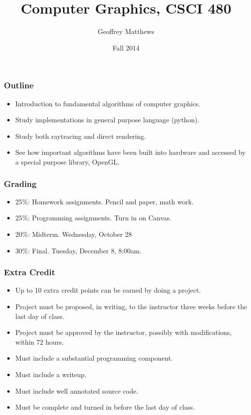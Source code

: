 \documentclass[slidestop,xcolor=pst]{beamer}
\title[Computer Graphics, CSCI 480]
{Computer Graphics, CSCI 480
}
\subtitle{} %
\author[Geoffrey Matthews]
{Geoffrey Matthews}
\institute[WWU/CS]
{
  Department of Computer Science\\
  Western Washington University
}
\date{Fall 2014}
\newcommand{\sect}[1]{\begin{frame}\frametitle{#1}}
\begin{document}
\begin{frame}
  \titlepage
\end{frame}


\sect{Outline}
\begin{itemize}
\item Introduction to fundamental algorithms of computer graphics.
\item Study implementations in general purpose language (python).
\item Study both raytracing and direct rendering.
\item See how important algorithms have been built into hardware and
  accessed by a special purpose library, OpenGL.
\end{itemize}

\end{frame}

\sect{Grading}
\begin{itemize}
\item 25\%: Homework assignments.  Pencil and paper, math work.  
\item 25\%: Programming assignments.  Turn in on Canvas.
\item 20\%: Midterm.  Wednesday, October 28
\item 30\%: Final.  Tuesday, December 8, 8:00am.
\end{itemize}
\end{frame}

\sect{Extra Credit}
\begin{itemize}
\item Up to 10 extra credit points can be earned by doing a project.
\item Project must be proposed, in writing, to the instructor three
  weeks before the last day of class.
\item Project must be approved by the instructor, possibly with
  modifications, within 72 hours.
\item Must include a substantial programming component.
\item Must include a writeup.
\item Must include well annotated source code.
\item Must be complete and turned in before the last day of class.
\end{itemize}
\end{frame}
\end{document}
